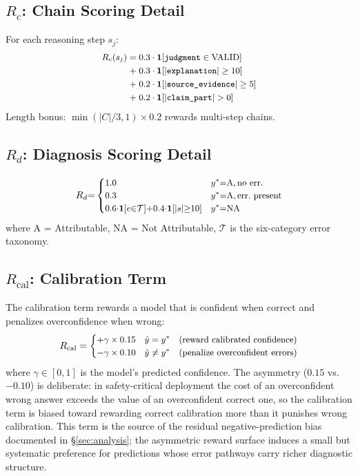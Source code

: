 \documentclass{article}
\begin{document}
\subsection{$R_c$: Chain Scoring Detail}

For each reasoning step $s_j$:
\begin{equation}
\small
\begin{aligned}
R_c(s_j) = & \; 0.3 \cdot \mathbf{1}[\texttt{judgment} \in \text{VALID}] \\
          + & \; 0.3 \cdot \mathbf{1}[|\texttt{explanation}| \geq 10] \\
          + & \; 0.2 \cdot \mathbf{1}[|\texttt{source\_evidence}| \geq 5] \\
          + & \; 0.2 \cdot \mathbf{1}[|\texttt{claim\_part}| > 0]
\end{aligned}
\end{equation}
Length bonus: $\min(|C|/3, 1) \times 0.2$ rewards multi-step chains.

\subsection{$R_d$: Diagnosis Scoring Detail}

\begin{equation}
\small
R_d {=}
\begin{cases}
1.0 & y^* {=} \text{A}, \text{no err.} \\
0.3 & y^* {=} \text{A}, \text{err.\ present} \\
0.6{\cdot}\mathbf{1}[e {\in} \mathcal{T}] {+} 0.4{\cdot}\mathbf{1}[|s| {\geq} 10] & y^* {=} \text{NA}
\end{cases}
\end{equation}
where A = Attributable, NA = Not Attributable, $\mathcal{T}$ is the six-category error taxonomy.

\subsection{$R_{\text{cal}}$: Calibration Term}
The calibration term rewards a model that is confident when correct and penalizes overconfidence when wrong:
\begin{equation}
\small
R_{\text{cal}} =
\begin{cases}
+\gamma \times 0.15 & \hat{y} = y^*  \quad \text{(reward calibrated confidence)} \\
-\gamma \times 0.10 & \hat{y} \neq y^* \quad \text{(penalize overconfident errors)}
\end{cases}
\end{equation}
where $\gamma \in [0, 1]$ is the model's predicted confidence.
The asymmetry ($0.15$ vs.\ $-0.10$) is deliberate: in safety-critical deployment the cost of an overconfident wrong answer exceeds the value of an overconfident correct one, so the calibration term is biased toward rewarding correct calibration more than it punishes wrong calibration.
This term is the source of the residual negative-prediction bias documented in \S\ref{sec:analysis}; the asymmetric reward surface induces a small but systematic preference for predictions whose error pathways carry richer diagnostic structure.
\end{document}
